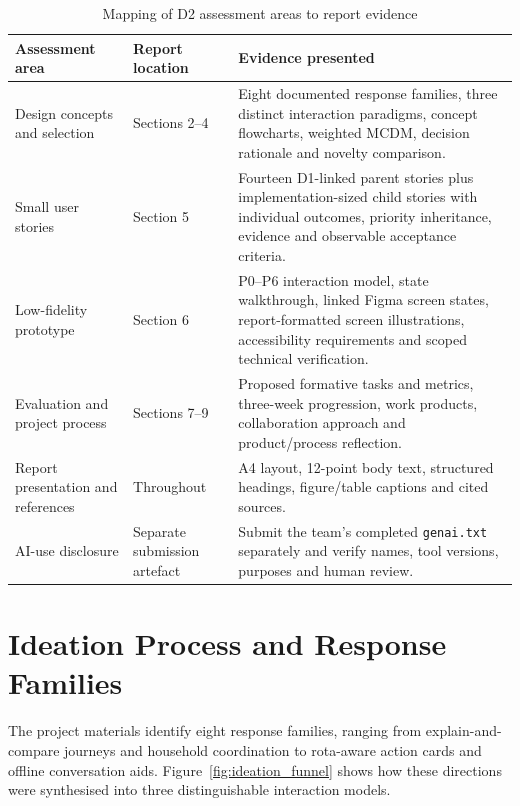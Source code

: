 \documentclass[12pt,a4paper]{article}
\newcommand{\code}[1]{\texttt{#1}}
\begin{document}
\begin{table}[H]
\centering
\small
\caption{Mapping of D2 assessment areas to report evidence}
\label{tab:assessment-map}
\begin{tabularx}{\textwidth}{@{}>{\raggedright\arraybackslash}p{3.1cm}>{\raggedright\arraybackslash}p{2.6cm}X@{}}
\toprule
\textbf{Assessment area} & \textbf{Report location} & \textbf{Evidence presented}\\
\midrule
Design concepts and selection & Sections 2--4 & Eight documented response families, three distinct interaction paradigms, concept flowcharts, weighted MCDM, decision rationale and novelty comparison.\\
\rowcolor{RowGray}
Small user stories & Section 5 & Fourteen D1-linked parent stories plus implementation-sized child stories with individual outcomes, priority inheritance, evidence and observable acceptance criteria.\\
Low-fidelity prototype & Section 6 & P0--P6 interaction model, state walkthrough, linked Figma screen states, report-formatted screen illustrations, accessibility requirements and scoped technical verification.\\
\rowcolor{RowGray}
Evaluation and project process & Sections 7--9 & Proposed formative tasks and metrics, three-week progression, work products, collaboration approach and product/process reflection.\\
Report presentation and references & Throughout & A4 layout, 12-point body text, structured headings, figure/table captions and cited sources.\\
\rowcolor{RowGray}
AI-use disclosure & Separate submission artefact & Submit the team's completed \code{genai.txt} separately and verify names, tool versions, purposes and human review.\\
\bottomrule
\end{tabularx}
\end{table}

\section{Ideation Process and Response Families}

The project materials identify eight response families, ranging from explain-and-compare journeys and household coordination to rota-aware action cards and offline conversation aids. Figure~\ref{fig:ideation_funnel} shows how these directions were synthesised into three distinguishable interaction models.
\end{document}
